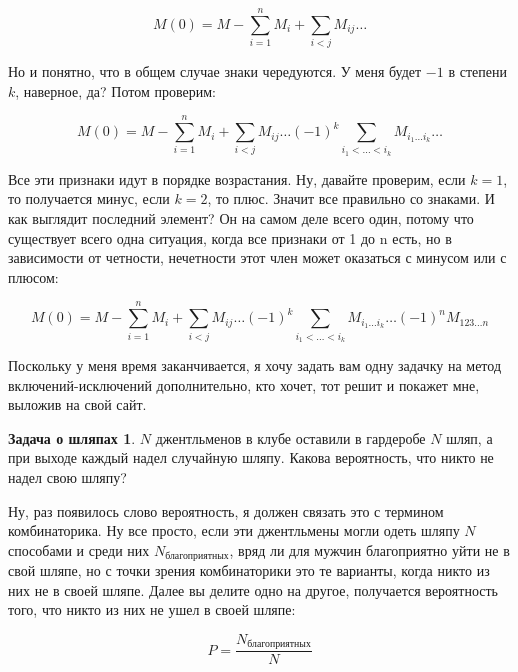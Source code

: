 \documentclass[russian]{lecture-notes}
\theoremstyle{definition}
\newtheorem*{hats}{Задача о шляпах}
\begin{document}
\begin{enumerate}
		\[
			M(0) = M - \sum_{i=1}^{n}M_i + \sum_{i<j}M_{ij} \ldots
		\]
		
		Но и понятно, что в общем случае знаки чередуются. У меня будет $-1$ в степени $k$, наверное, да? Потом проверим:
		
		\[
			M(0) = M - \sum_{i=1}^{n}M_i + \sum_{i<j}M_{ij} \ldots (-1)^k \sum_{i_1<\ldots<i_k}M_{i_1 \ldots i_k} \ldots
		\]
		
		Все эти признаки идут в порядке возрастания. Ну, давайте проверим, если $k = 1$, то получается минус, если $k = 2$, то плюс. Значит все правильно со знаками. И как выглядит последний элемент? Он на самом деле всего один, потому что существует всего одна ситуация, когда все признаки от 1 до n есть, но в зависимости от четности, нечетности этот член может оказаться с минусом или с плюсом:
		
		\[
			M(0) = M - \sum_{i=1}^{n}M_i + \sum_{i<j}M_{ij} \ldots (-1)^k \sum_{i_1<\ldots<i_k}M_{i_1 \ldots i_k} \ldots (-1)^n M_{123 \ldots n}
		\]
		
		Поскольку у меня время заканчивается, я хочу задать вам одну задачку на метод включений-исключений	дополнительно, кто хочет, тот решит и покажет мне, выложив на свой сайт.
		
		
		\begin{hats}
			$N$ джентльменов в клубе оставили в гардеробе $N$ шляп, а при выходе каждый надел случайную шляпу. Какова вероятность, что никто не надел свою шляпу?
		\end{hats}
	
		Ну, раз появилось слово вероятность, я должен связать это с термином комбинаторика. Ну все просто, если эти джентльмены могли одеть шляпу $N$ способами и среди них $N_{\text{благоприятных}}$, вряд ли для мужчин благоприятно уйти не в свой шляпе, но с точки зрения комбинаторики это те варианты, когда никто из них не в своей шляпе. Далее вы делите одно на другое, получается вероятность того, что никто из них не ушел в своей шляпе:
		
		\[
			P = \frac{N_{\text{благоприятных}}}{N}
		\]
		
	\end{enumerate}
	
\end{document}
